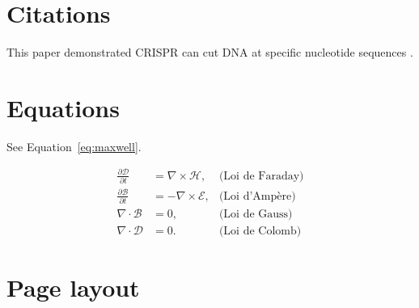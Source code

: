 \section{Citations}
This paper demonstrated CRISPR can cut DNA at specific nucleotide sequences \cite{Jinek2012}.


\section{Equations}
See Equation~\ref{eq:maxwell}.

\begin{equation}
    \label{eq:maxwell}
    \begin{aligned}
    \frac{\partial\mathcal{D}}{\partial t} & = \nabla\times\mathcal{H},   & \text{(Loi de Faraday)}\\
    \frac{\partial\mathcal{B}}{\partial t} & = -\nabla\times\mathcal{E},  & \text{(Loi d'Ampère)}\\
    \nabla\cdot\mathcal{B}                 & = 0,                         & \text{(Loi de Gauss)}\\
    \nabla\cdot\mathcal{D}                 & = 0.                         & \text{(Loi de Colomb)}
    \end{aligned}
\end{equation}

\clearpage
\section{Page layout}
\layout
